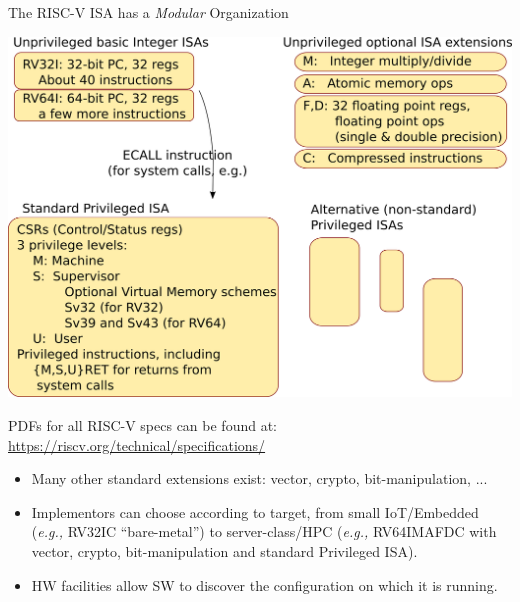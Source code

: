 \documentclass{article}
\newcommand{\eg}{\emph{e.g.,}}
\begin{document}
\begin{center}
{\Huge
  The RISC-V ISA has a \emph{Modular} Organization}

\vspace*{0.3in}

{\includegraphics[scale=0.7]{Figs/ISA_Modularity.png}}

PDFs for all RISC-V specs can be found at: \url{https://riscv.org/technical/specifications/}

\vspace{0.5in}

\begin{minipage}{11in}
  \begin{itemize}\LARGE

  \item Many other standard extensions exist: vector, crypto, bit-manipulation, ...

  \item Implementors can choose according to target, from small
    IoT/Embedded ({\eg} RV32IC ``bare-metal'') to server-class/HPC ({\eg}
    RV64IMAFDC with vector, crypto, bit-manipulation and standard
    Privileged ISA).

  \item HW facilities allow SW to discover the configuration on which it is running.

  \end{itemize}
\end{minipage}

\end{center}

\clearpage

\end{document}
